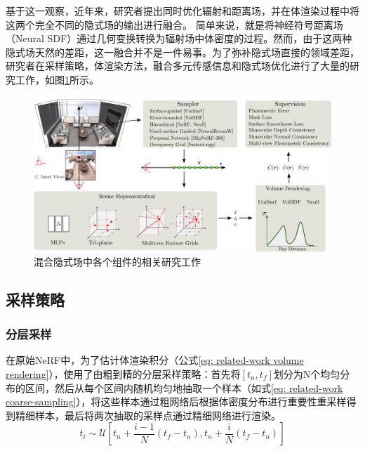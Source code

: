 基于这一观察，近年来，研究者提出同时优化辐射和距离场，并在体渲染过程中将这两个完全不同的隐式场的输出进行融合\cite{oechsle_unisurf_2021,gropp_implicit_2020,yariv_multiview_2020,yariv_volume_2021,wang_neus_2021,shao_doublefield_2022,darmon_improving_2022,ueda_neural_2022,long_sparseneus_2022,yu_monosdf_2022,wang_pet-neus_2023,yuan_monocular_2023,liang_hr-neus_2023,chen_dehazenerf_2023,zhu_vdn-nerf_2023,azinovic_neural_2022, sun_neural_2022}。 简单来说，就是将神经符号距离场（Neural SDF）通过几何变换转换为辐射场中体密度的过程。然而，由于这两种隐式场天然的差距，这一融合并不是一件易事。为了弥补隐式场直接的领域差距，研究者在采样策略\cite{yariv_volume_2021, mildenhall_nerf_2020, barron_mip-nerf_2022, oechsle_unisurf_2021}，体渲染方法\cite{oechsle_unisurf_2021,yariv_volume_2021,wang_neus_2021}，融合多元传感信息\cite{azinovic_neural_2022,yu_monosdf_2022}和隐式场优化进行了大量的研究工作，如图\ref{fig:related-work sdfstudio}所示\cite{yu_sdfstudio_2022}。

\begin{figure}[t]
    \centering
    \includegraphics[width=\textwidth]{undergraduate-thesis/images/sdfstudio.png}
    \caption{混合隐式场中各个组件的相关研究工作\cite{yu_sdfstudio_2022}}
    \label{fig:related-work sdfstudio}
\end{figure}

\subsection{采样策略}
\subsubsection{分层采样}
\label{sec: coarse-to-fine sampling}
在原始NeRF中，为了估计体渲染积分（公式\ref{eq: related-work volume rendering}），使用了由粗到精的分层采样策略：首先将$[t_n,t_f]$划分为N个均匀分布的区间，然后从每个区间内随机均匀地抽取一个样本（如式\ref{eq: related-work coarse-sampling}），将这些样本通过粗网络后根据体密度分布进行重要性重采样得到精细样本，最后将两次抽取的采样点通过精细网络进行渲染。
\begin{equation}
    t_i\sim\mathcal{U}\left[t_n+\frac{i-1}{N}(t_f-t_n), t_n+\frac{i}{N}(t_f-t_n)\right]
    \label{eq: related-work coarse-sampling}
\end{equation}

